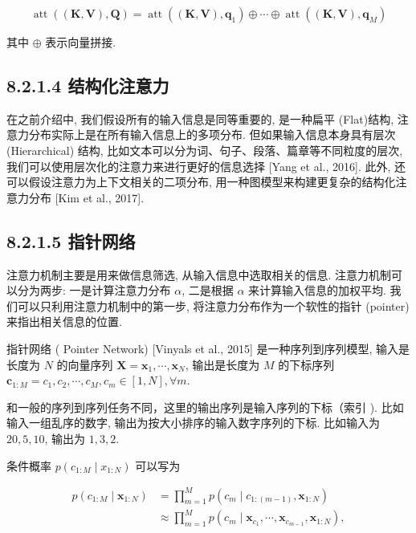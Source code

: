 \documentclass[10pt]{article}
\begin{document}
\begin{equation*}
\operatorname{att}((\boldsymbol{K}, \boldsymbol{V}), \boldsymbol{Q})=\operatorname{att}\left((\boldsymbol{K}, \boldsymbol{V}), \boldsymbol{q}_{1}\right) \oplus \cdots \oplus \operatorname{att}\left((\boldsymbol{K}, \boldsymbol{V}), \boldsymbol{q}_{M}\right) \tag{8.11}
\end{equation*}


其中 $\oplus$ 表示向量拼接.

\subsection*{8.2.1.4 结构化注意力}
在之前介绍中, 我们假设所有的输入信息是同等重要的, 是一种扁平 (Flat)结构, 注意力分布实际上是在所有输入信息上的多项分布. 但如果输入信息本身具有层次 (Hierarchical) 结构, 比如文本可以分为词、句子、段落、篇章等不同粒度的层次, 我们可以使用层次化的注意力来进行更好的信息选择 [Yang et al., 2016]. 此外, 还可以假设注意力为上下文相关的二项分布, 用一种图模型来构建更复杂的结构化注意力分布 [Kim et al., 2017].

\subsection*{8.2.1.5 指针网络}
注意力机制主要是用来做信息筛选, 从输入信息中选取相关的信息. 注意力机制可以分为两步: 一是计算注意力分布 $\alpha$, 二是根据 $\alpha$ 来计算输入信息的加权平均. 我们可以只利用注意力机制中的第一步, 将注意力分布作为一个软性的指针 (pointer) 来指出相关信息的位置.

指针网络 ( Pointer Network) [Vinyals et al., 2015] 是一种序列到序列模型, 输入是长度为 $N$ 的向量序列 $\boldsymbol{X}=\boldsymbol{x}_{1}, \cdots, \boldsymbol{x}_{N}$, 输出是长度为 $M$ 的下标序列 $\boldsymbol{c}_{1: M}=c_{1}, c_{2}, \cdots, c_{M}, c_{m} \in[1, N], \forall m$.

和一般的序列到序列任务不同，这里的输出序列是输入序列的下标（索引 ). 比如输入一组乱序的数字, 输出为按大小排序的输入数字序列的下标. 比如输入为 $20,5,10$, 输出为 $1,3,2$.

条件概率 $p\left(c_{1: M} \mid x_{1: N}\right)$ 可以写为


\begin{align*}
p\left(c_{1: M} \mid \boldsymbol{x}_{1: N}\right) & =\prod_{m=1}^{M} p\left(c_{m} \mid c_{1:(m-1)}, \boldsymbol{x}_{1: N}\right)  \tag{8.12}\\
& \approx \prod_{m=1}^{M} p\left(c_{m} \mid \boldsymbol{x}_{c_{1}}, \cdots, \boldsymbol{x}_{c_{m-1}}, \boldsymbol{x}_{1: N}\right), \tag{8.13}
\end{align*}
\end{document}
